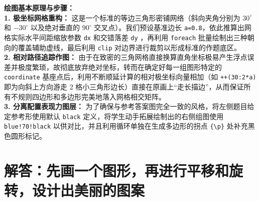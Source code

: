 \documentclass[12pt, a4paper]{ctexrep}
\begin{document}
{\small\color{blue!70!black}
\textbf{绘图基本原理与步骤：}\\
\textbf{1. 极坐标网格重构：} 这是一个标准的等边三角形密铺网络（斜向夹角分别为 $30^\circ$ 和 $-30^\circ$ 以及绝对垂直的 $90^\circ$ 交叉点）。我们预设基准边长 \texttt{a=0.8}，依此推算出网格实际水平间距缩放参数 \texttt{dx} 和交错落差 \texttt{dy} ，再利用 \texttt{foreach} 批量绘制出三种朝向的覆盖辅助虚线，最后利用 \texttt{clip} 对边界进行裁剪以形成标准的作题底区。\\
\textbf{2. 相对路径追踪作图：} 由于在致密的三角网格直接换算直角坐标极易产生浮点误差并极度繁琐，故彻底放弃绝对坐标，转而在确定好每一组图形特定的 \texttt{coordinate} 基座点后，利用不断顺延计算的相对极坐标向量相加（如 \texttt{++(30:2*a)} 即为向斜上方向游走 2 格小三角形边长）直接在原画上“走长描边”，从而保证所有不规则四边形和多边形完美地落入网格相交矩阵。\\
\textbf{3. 分离配置表现力图层：} 为了确保与参考答案图完全一致的风格，将左侧题目给定参考形使用默认 \texttt{black} 定义，将学生动手拓展绘制出的右侧组图使用 \texttt{blue!70!black} 以供对比，并且利用循环单独在生成多边形的拐点 \texttt{\{\textbackslash{}p\}} }处补充黑色圆形标记。%
\newpage

\section{解答：先画一个图形，再进行平移和旋转，设计出美丽的图案}

\vspace{0.6cm}
\end{document}

